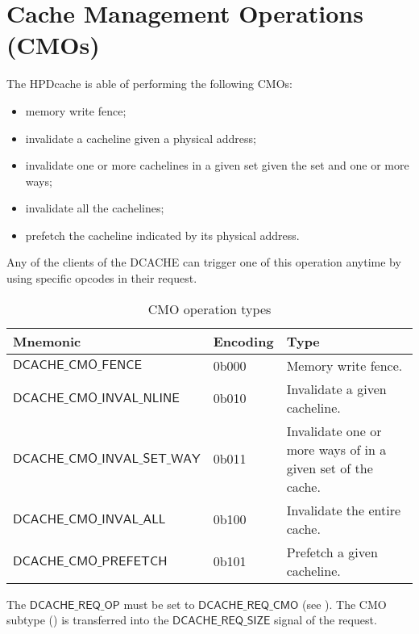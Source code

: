 \documentclass[10pt,titlepage,twoside]{book}
\begin{document}
\chapter{Cache Management Operations (CMOs)}
\minitoc
\newpage

The \ac{HPDcache} is able of performing the following \aclp{CMO}:

\begin{itemize}
  \item memory write fence;
  \item invalidate a cacheline given a physical address;
  \item invalidate one or more cachelines in a given set given the set and one or more ways;
  \item invalidate all the cachelines;
  \item prefetch the cacheline indicated by its physical address.
\end{itemize}

Any of the clients of the DCACHE can trigger one of this operation anytime by using specific opcodes in their request.

\begin{table}[h!]
\begin{center}
\caption{CMO operation types}%
{\footnotesize
\begin{tabular}{lll}
  \toprule
  \textbf{Mnemonic}
  & \textbf{Encoding}
  & \textbf{Type} \\
  \midrule
  $\mathsf{DCACHE\_CMO\_FENCE}$
  & 0b000
  & Memory write fence.\\
  \midrule
  $\mathsf{DCACHE\_CMO\_INVAL\_NLINE}$
  & 0b010
  & Invalidate a given cacheline.\\
  \midrule
  $\mathsf{DCACHE\_CMO\_INVAL\_SET\_WAY}$
  & 0b011
  & Invalidate one or more ways of in a given set of the cache.\\
  \midrule
  $\mathsf{DCACHE\_CMO\_INVAL\_ALL}$
  & 0b100
  & Invalidate the entire cache.\\
  \midrule
  $\mathsf{DCACHE\_CMO\_PREFETCH}$
  & 0b101
  & Prefetch a given cacheline.\\
  \midrule
\end{tabular}}
\end{center}
\end{table}

The $\mathsf{DCACHE\_REQ\_OP}$ must be set to $\mathsf{DCACHE\_REQ\_CMO}$ (see ).
The \ac{CMO} subtype () is transferred into the $\mathsf{DCACHE\_REQ\_SIZE}$ signal of the request.
\end{document}
